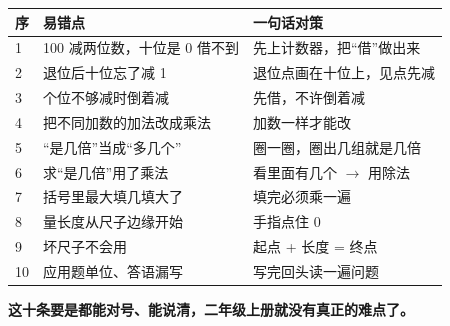 \begin{center}
\small
\begin{tabularx}{\linewidth}{@{}p{0.7cm}p{5.2cm}X@{}}
\toprule
\textbf{序} & \textbf{易错点} & \textbf{一句话对策} \\
\midrule
1 & 100 减两位数，十位是 0 借不到 & 先上计数器，把“借”做出来 \\
2 & 退位后十位忘了减 1 & 退位点画在十位上，见点先减 \\
3 & 个位不够减时倒着减 & 先借，不许倒着减 \\
4 & 把不同加数的加法改成乘法 & 加数一样才能改 \\
5 & “是几倍”当成“多几个” & 圈一圈，圈出几组就是几倍 \\
6 & 求“是几倍”用了乘法 & 看里面有几个 $\to$ 用除法 \\
7 & 括号里最大填几填大了 & 填完必须乘一遍 \\
8 & 量长度从尺子边缘开始 & 手指点住 0 \\
9 & 坏尺子不会用 & 起点 + 长度 = 终点 \\
10 & 应用题单位、答语漏写 & 写完回头读一遍问题 \\
\bottomrule
\end{tabularx}
\end{center}

\noindent\textbf{这十条要是都能对号、能说清，二年级上册就没有真正的难点了。}
